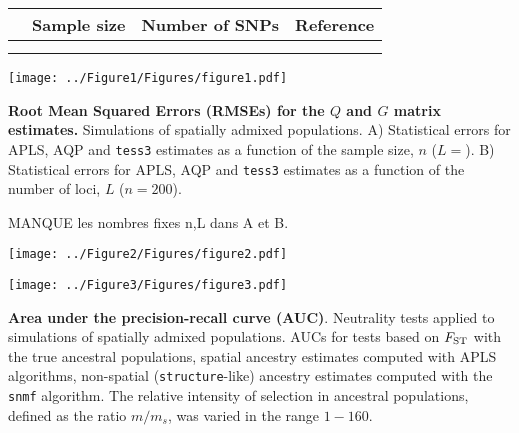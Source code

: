 \clearpage
\newpage
  
\begin{center}
\begin{table}
\caption{{\bf }}
\begin{tabular}{lccc}
\hline
{\bf } &   Sample size & Number of SNPs &  Reference \\
\hline
 &  &   & \\

  &  &   & \\
 \hline
\end{tabular}
\end{table}
\end{center}        




\clearpage 
\newpage


\begin{center}
\texttt{[image: ../Figure1/Figures/figure1.pdf]}
\end{center}  
 {\bf Root Mean Squared Errors (RMSEs) for the $Q$ and $G$ matrix estimates.} Simulations of spatially admixed populations. A) Statistical errors for APLS, AQP and {\tt tess3} estimates as a function of the sample  size, $n$ ($L = $). B) Statistical errors for APLS, AQP and {\tt tess3} estimates as a function of the number of loci, $L$ ($n = 200$).



MANQUE les nombres fixes n,L dans A et B.

\clearpage 
\newpage


\begin{center}
\texttt{[image: ../Figure2/Figures/figure2.pdf]}
\end{center}  
 {\bf } 

\clearpage 
\newpage

\begin{center}
\texttt{[image: ../Figure3/Figures/figure3.pdf]}
\end{center}
 {\bf Area under the precision-recall curve (AUC)}. Neutrality tests applied to simulations of spatially admixed populations. AUCs for tests based on $F_{\rm ST}$ with the true ancestral populations,  spatial ancestry estimates computed with APLS algorithms, non-spatial ({\tt structure}-like) ancestry estimates computed with the {\tt snmf} algorithm. The relative intensity of selection in ancestral populations, defined as the ratio $m/m_s$, was varied in the range $1-160$.


